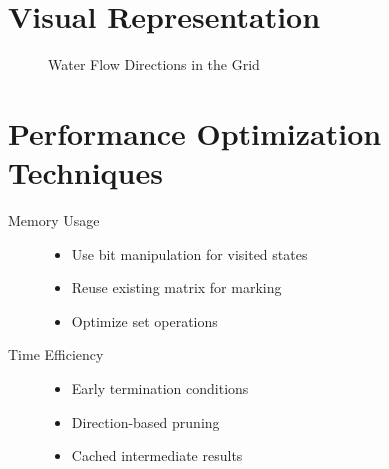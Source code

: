 \section*{Visual Representation}
\begin{figure}[h]
    \centering
    \caption{Water Flow Directions in the Grid}
    \label{fig:water_flow}
\end{figure}

\section*{Performance Optimization Techniques}
\begin{description}
    \item[Memory Usage] 
    \begin{itemize}
        \item Use bit manipulation for visited states
        \item Reuse existing matrix for marking
        \item Optimize set operations
    \end{itemize}
    
    \item[Time Efficiency]
    \begin{itemize}
        \item Early termination conditions
        \item Direction-based pruning
        \item Cached intermediate results
    \end{itemize}
\end{description}

\printindex
